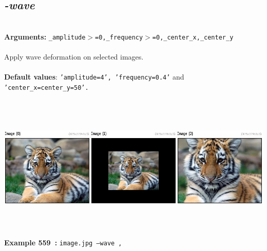 \documentclass[a4paper,11pt,twoside]{book}
\begin{document}
\subsection{\emph{-wave} }\vspace*{-0.5em}
~\\\textbf{Arguments: } 
{\small \texttt{\_amplitude$>$=0,\_frequency$>$=0,\_center\_x,\_center\_y}}\\~\\
Apply wave deformation on selected images.
~\\~\\\textbf{Default values}: {\small \texttt{'amplitude=4', 'frequency=0.4'} and \texttt{'center\_x=center\_y=50'.}}
\begin{center}\includegraphics[keepaspectratio=true,height=7cm,width=\textwidth]{img/gmic_def559.jpg}\\
{\footnotesize \textbf{Example 559~:} \texttt{image.jpg --wave ,}}
\end{center}
\end{document}
